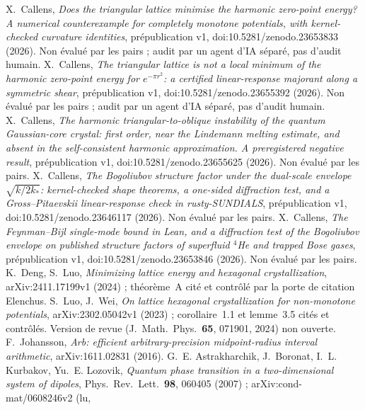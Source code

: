  X.~Callens, \emph{Does the triangular lattice minimise the harmonic zero-point energy? A numerical
counterexample for completely monotone potentials, with kernel-checked curvature identities}, prépublication v1,
doi:10.5281/zenodo.23653833 (2026). Non évalué par les pairs ; audit par un agent d'IA séparé, pas d'audit humain.
 X.~Callens, \emph{The triangular lattice is not a local minimum of the harmonic zero-point energy for
$e^{-\pi r^2}$: a certified linear-response majorant along a symmetric shear}, prépublication v1,
doi:10.5281/zenodo.23655392 (2026). Non évalué par les pairs ; audit par un agent d'IA séparé, pas d'audit humain.
 X.~Callens, \emph{The harmonic triangular-to-oblique instability of the quantum Gaussian-core crystal:
first order, near the Lindemann melting estimate, and absent in the self-consistent harmonic approximation. A
preregistered negative result}, prépublication v1, doi:10.5281/zenodo.23655625 (2026). Non évalué par les pairs.
 X.~Callens, \emph{The Bogoliubov structure factor under the dual-scale envelope $\sqrt{k/2k_*}$:
kernel-checked shape theorems, a one-sided diffraction test, and a Gross--Pitaevskii linear-response check in
rusty-SUNDIALS}, prépublication v1, doi:10.5281/zenodo.23646117 (2026). Non évalué par les pairs.
 X.~Callens, \emph{The Feynman--Bijl single-mode bound in Lean, and a diffraction test of the Bogoliubov
envelope on published structure factors of superfluid $^4$He and trapped Bose gases}, prépublication v1,
doi:10.5281/zenodo.23653846 (2026). Non évalué par les pairs.
 K.~Deng, S.~Luo, \emph{Minimizing lattice energy and hexagonal crystallization},
arXiv:2411.17199v1 (2024) ; théorème~A cité et contrôlé par la porte de citation Elenchus.
 S.~Luo, J.~Wei, \emph{On lattice hexagonal crystallization for non-monotone potentials},
arXiv:2302.05042v1 (2023) ; corollaire~1.1 et lemme~3.5 cités et contrôlés. Version de revue (J.\ Math.\ Phys.\
\textbf{65}, 071901, 2024) non ouverte.
 F.~Johansson, \emph{Arb: efficient arbitrary-precision midpoint-radius interval arithmetic},
arXiv:1611.02831 (2016).
 G.~E. Astrakharchik, J.~Boronat, I.~L. Kurbakov, Yu.~E. Lozovik, \emph{Quantum phase transition in a
two-dimensional system of dipoles}, Phys.\ Rev.\ Lett.\ \textbf{98}, 060405 (2007) ; arXiv:cond-mat/0608246v2 (lu,
